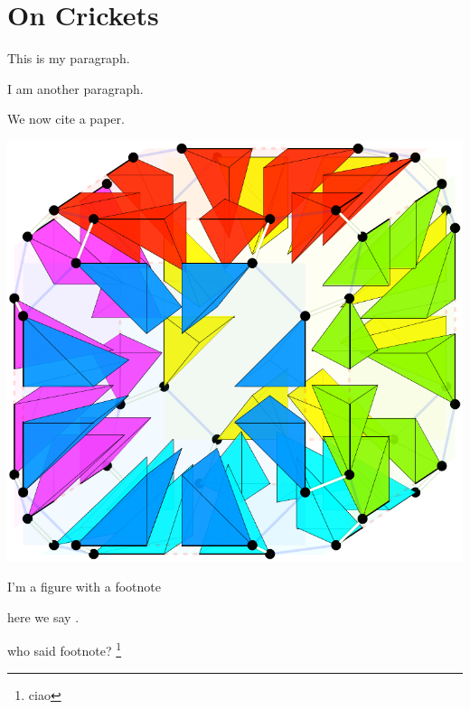 \chapter{On Crickets}

\blindtext

This is my paragraph.

\blindtext

\blindtext

I am another paragraph.

\blindtext

We now cite a paper\cite{Visscher2008}.

\blindtext

\begin{marginfigure}
  \includegraphics{images/gmaps-3d-simplices}
  \caption{I'm a figure with a footnote}
\end{marginfigure}

\blindtext

here we say .

\blindtext

who said footnote? \footnote{ciao}
